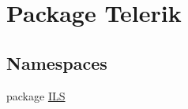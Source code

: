 \hypertarget{namespace_telerik}{\section{Package Telerik}
\label{namespace_telerik}
}
\subsection*{Namespaces}
\begin{DoxyCompactItemize}
\item 
package \hyperlink{namespace_telerik_1_1_i_l_s}{I\-L\-S}
\end{DoxyCompactItemize}
